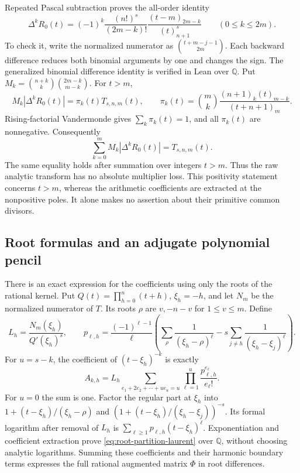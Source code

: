 \documentclass[11pt]{article}
\theoremstyle{remark}
\newcommand{\Q}{\mathbb Q}
\begin{document}
Repeated Pascal subtraction proves the all-order identity
\[
 \Delta^k R_0(t)=(-1)^k\frac{(n!)^s}{(2m-k)!}
       \frac{(t-m)_{2m-k}}{(t)_{n+1}^s}\qquad(0\le k\le2m).
\]
To check it, write the normalized numerator as
\(\binom{t+m-j-1}{2m}\). Each backward difference reduces both
binomial arguments by one and changes the sign. The generalized
binomial difference identity is verified in Lean over \(\mathbb Q\).
Put \(M_k=\binom{n+k}k\binom{2m-k}{m-k}\). For \(t>m\),
\[
 M_k|\Delta^kR_0(t)|=\pi_k(t)T_{s,n,m}(t),\qquad
 \pi_k(t)=\binom mk\frac{(n+1)_k(t)_{m-k}}{(t+n+1)_m}.
\]
Rising-factorial Vandermonde gives \(\sum_k\pi_k(t)=1\), and all
\(\pi_k(t)\) are nonnegative. Consequently
\begin{equation}
 \sum_{k=0}^m M_k|\Delta^kR_0(t)|=T_{s,n,m}(t).
 \label{eq:signed-newton-no-loss}
\end{equation}
The same equality holds after summation over integers \(t>m\).
Thus the raw analytic transform has no absolute multiplier loss.
This positivity statement concerns \(t>m\), whereas the arithmetic
coefficients are extracted at the nonpositive poles. It alone makes
no assertion about their primitive common divisors.

\subsection{Root formulas and an adjugate polynomial pencil}
There is an exact expression for the coefficients using only the roots
of the rational kernel. Put \(Q(t)=\prod_{h=0}^n(t+h)\),
\(\xi_h=-h\), and let \(N_m\) be the normalized numerator of \(T\).
Its roots \(\rho\) are \(v,-n-v\) for \(1\le v\le m\).
Define
\[
 L_h=\frac{N_m(\xi_h)}{Q'(\xi_h)^s},\qquad
 p_{\ell,h}=\frac{(-1)^{\ell-1}}\ell
 \left(\sum_\rho\frac1{(\xi_h-\rho)^\ell}
       -s\sum_{j\ne h}\frac1{(\xi_h-\xi_j)^\ell}\right).
\]
For \(u=s-k\), the coefficient of \((t-\xi_h)^{-k}\) is exactly
\begin{equation}
 A_{k,h}=L_h
 \sum_{e_1+2e_2+\cdots+ue_u=u}
       \prod_{\ell=1}^u\frac{p_{\ell,h}^{e_\ell}}{e_\ell!}.
 \label{eq:root-partition-laurent}
\end{equation}
For \(u=0\) the sum is one. Factor the regular part at \(\xi_h\)
into \(1+(t-\xi_h)/(\xi_h-\rho)\) and
\((1+(t-\xi_h)/(\xi_h-\xi_j))^{-s}\). Its formal logarithm
after removal of \(L_h\) is \(\sum_{\ell\ge1}p_{\ell,h}(t-\xi_h)^\ell\).
Exponentiation and coefficient extraction prove
\eqref{eq:root-partition-laurent} over \(\Q\), without choosing
analytic logarithms. Summing these coefficients and their harmonic
boundary terms expresses the full rational augmented matrix \(\Phi\)
in root differences.
\end{document}
